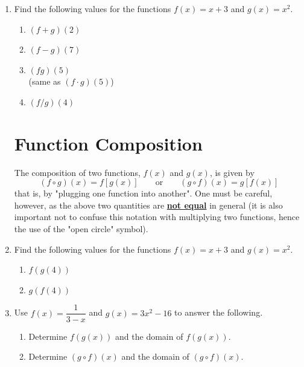 \documentclass[11pt]{article}
\begin{document}
\begin{enumerate}
\item Find the following values for the functions $f(x) = x + 3$ and $g(x) = x^2$.
\begin{enumerate}
\item $(f+g)(2)$ \vfill 
\item $(f-g)(7)$ \vfill
\item $(fg)(5)$ \\(same as $(f\cdot g )(5)$)\vfill
\item $(f/g)(4)$\vfill
\end{enumerate}




\newpage


\section{Function Composition}
The composition of two functions, $f(x)$ and $g(x)$, is given by
	$$(f \circ g)(x)=f[g(x)] \quad \quad \text{or} \quad \quad (g \circ f)(x)=g[f(x)]$$
that is, by "plugging one function into another". One must be careful, however, as the above two quantities are \textbf{\underline{not equal}} in general (it is also important not to confuse this notation with multiplying two functions, hence the use of the "open circle" symbol).

\item Find the following values for the functions $f(x) = x + 3$ and $g(x) = x^2$.
\begin{enumerate}
\item $f(g(4))$\\[1in]
\item $g(f(4))$\\[1in]

\end{enumerate}


\item Use $f(x) = \dfrac{1}{3-x}$ and $g(x)=3x^2-16$ to answer the following.
\begin{enumerate}
\item Determine $f(g(x))$ and the domain of $f(g(x))$. \\[1in]
\item Determine $(g \circ f)(x)$ and the domain of $(g \circ f)(x)$. \\[1in]


\end{enumerate}
\end{enumerate}
\end{document}
